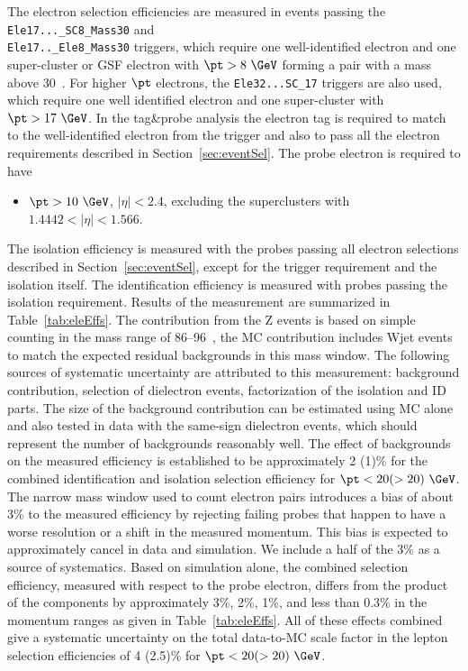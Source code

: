 The electron selection efficiencies are measured in events passing 
the \verb=Ele17..._SC8_Mass30= and \\\verb=Ele17.._Ele8_Mass30= triggers,
which require one well-identified electron and one super-cluster or GSF electron with $\pt>8~\GeV$ forming a pair with a mass
above 30~\GeVcc.  
For higher $\pt$ electrons, the \verb=Ele32...SC_17= triggers are also used, 
which require one well identified electron and one super-cluster with $\pt >17~\GeV$.
In the tag\&probe analysis the electron tag is required to match to the well-identified electron 
from the trigger and also to pass all the electron requirements described in Section~\ref{sec:eventSel}.
The probe electron is required to have
\begin{itemize}
\item $\pt>10~\GeV$, $|\eta|<2.4$, excluding the superclusters with $1.4442<|\eta|<1.566$.
\end{itemize}
The isolation efficiency is measured with the probes passing all electron selections 
described in Section~\ref{sec:eventSel},
except for the trigger requirement and the isolation itself.
The identification efficiency is measured with probes passing the isolation requirement.
Results of the measurement are summarized in Table~\ref{tab:eleEffs}.
The contribution from the Z events is based on simple counting in the mass range of 86--96~\GeVc,
the MC contribution includes Wjet events to match the expected residual backgrounds in this mass window.
The following sources of systematic uncertainty are attributed to this measurement:
background contribution, selection of dielectron events, factorization of the isolation and ID parts.
The size of the background contribution can be estimated using MC alone
and also  tested in data with  the same-sign dielectron
events, which should represent the number of backgrounds reasonably well.
The effect of backgrounds on the measured efficiency is established to be approximately 
2 (1)\% for the combined identification
and isolation selection efficiency for $\pt<20 (>20)~\GeV$.
The narrow mass window used to count electron pairs introduces a bias of about 3\% 
to the measured efficiency
by rejecting failing probes that happen to have a worse resolution or a shift
in the measured momentum.
This bias is expected to approximately cancel in data and simulation.
We include a half of the 3\% as a source of systematics.
Based on simulation alone, the combined selection efficiency, measured with respect to the probe electron,
differs from the product of the components by
approximately 3\%, 2\%, 1\%, and less than 0.3\% in the momentum ranges as given in Table~\ref{tab:eleEffs}.
All of these effects combined give a systematic uncertainty on the total data-to-MC scale factor
in the lepton selection efficiencies of 4 (2.5)\% for $\pt<20 (>20)~\GeV$.


